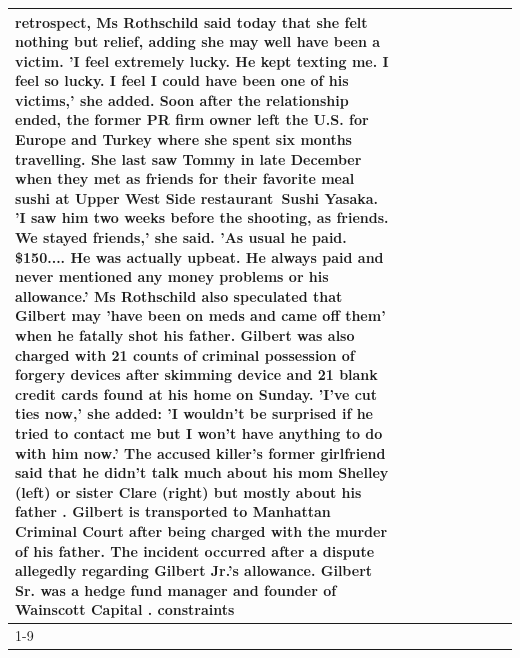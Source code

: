 \begin{table}[H]
\begin{tabular}{lllrlllll}
retrospect, Ms Rothschild said today that she felt nothing but relief, adding she may well have been a victim. 'I feel extremely lucky. He kept texting me. I feel so lucky. I feel I could have been one of his victims,' she added. Soon after the relationship ended, the former PR firm owner left the U.S. for Europe and Turkey where she spent six months  travelling. She last saw Tommy in late December when they met as friends for their favorite meal sushi at Upper West Side restaurant Sushi Yasaka. 'I saw him two weeks before the shooting, as friends. We stayed friends,' she said. 'As usual he paid. \$150.... He was actually upbeat. He always paid and never mentioned any money problems or his allowance.' Ms Rothschild also speculated that Gilbert may 'have been on meds and came off them' when he fatally shot his father. Gilbert was also charged with 21 counts of criminal possession of forgery devices after skimming device and 21 blank credit cards found at his home on Sunday. 'I've cut ties now,' she added: 'I wouldn’t be surprised if he tried to contact me but I won’t have anything to do with him now.' The accused killer's former girlfriend said that he didn't talk much about his mom Shelley (left) or sister Clare (right) but mostly about his father . Gilbert is transported to Manhattan Criminal Court  after being charged with the murder of his father. The incident occurred after a dispute allegedly regarding Gilbert Jr.'s allowance. Gilbert Sr. was a hedge fund manager and founder of Wainscott Capital . constraints \\
\cline{1-9}

\end{tabular}
\end{table}
